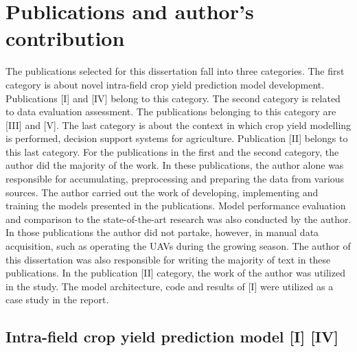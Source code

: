 \section{Publications and author's contribution}

The publications selected for this dissertation fall into three categories. The first category is about novel intra-field crop yield prediction model development. Publications [I] and [IV] belong to this category. The second category is related to data evaluation assessment. The publications belonging to this category are [III] and [V]. The last category is about the context in which crop yield modelling is performed, decision support systems for agriculture. Publication [II] belongs to this last category. For the publications in the first and the second category, the author did the majority of the work. In these publications, the author alone was responsible for accumulating, preprocessing and preparing the data from various sources. The author carried out the work of developing, implementing and training the models presented in the publications. Model performance evaluation and comparison to the state-of-the-art research was also conducted by the author. In those publications the author did not partake, however, in manual data acquisition, such as operating the UAVs during the growing season. The author of this dissertation was also responsible for writing the majority of text in these publications. In the publication [II] category, the work of the author was utilized in the study. The model architecture, code and results of [I] were utilized as a case study in the report.

\subsection*{Intra-field crop yield prediction model [I] [IV]}


